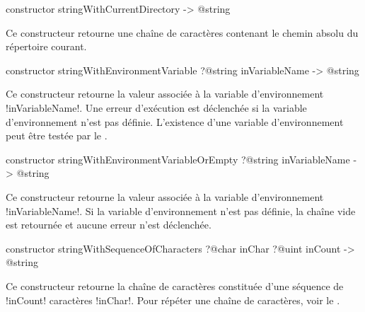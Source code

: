 
\begin{galgas3box}
constructor stringWithCurrentDirectory -> @string
\end{galgas3box}

Ce constructeur retourne une chaîne de caractères contenant le chemin absolu du répertoire courant.





\begin{galgas3box}
constructor stringWithEnvironmentVariable
  ?@string inVariableName
  -> @string
\end{galgas3box}

Ce constructeur retourne la valeur associée à la variable d'environnement \ggst!inVariableName!. Une erreur d'exécution est déclenchée si la variable d'environnement n'est pas définie. L'existence d'une variable d'environnement peut être testée par le .






\begin{galgas3box}
constructor stringWithEnvironmentVariableOrEmpty
  ?@string inVariableName
  -> @string
\end{galgas3box}

Ce constructeur retourne la valeur associée à la variable d'environnement \ggst!inVariableName!. Si la variable d'environnement n'est pas définie, la chaîne vide est retournée et aucune erreur n'est déclenchée.







\begin{galgas3box}
constructor stringWithSequenceOfCharacters
  ?@char inChar
  ?@uint inCount
  -> @string
\end{galgas3box}

Ce constructeur retourne la chaîne de caractères constituée d'une séquence de \ggst!inCount! caractères \ggst!inChar!. Pour répéter une chaîne de caractères, voir le .





